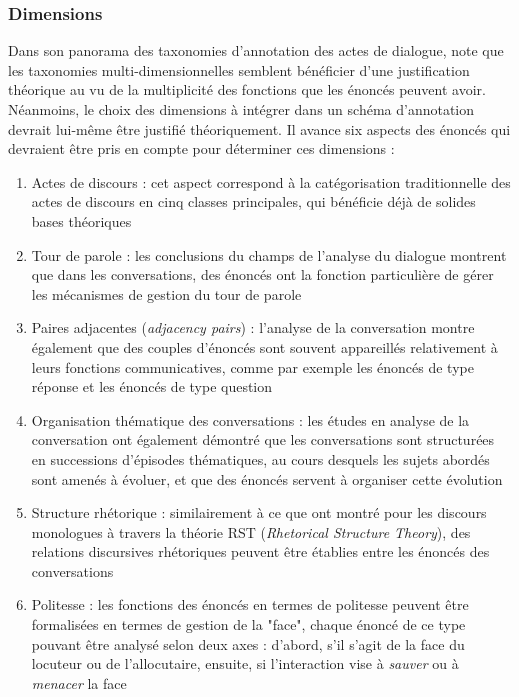 \documentclass[10pt,a4paper,twoside]{article}
\begin{document}
\subsubsection{Dimensions}
\label{subsubsec:dimensions}

Dans son panorama des taxonomies d'annotation des actes de dialogue, \citet{popescu2005dialogue} note que les taxonomies multi-dimensionnelles semblent bénéficier d'une justification théorique au vu de la multiplicité des fonctions que les énoncés peuvent avoir. Néanmoins, le choix des dimensions à intégrer dans un schéma d'annotation devrait lui-même être justifié théoriquement. Il avance six aspects des énoncés qui devraient être pris en compte pour déterminer ces dimensions :

\begin{enumerate}
	\item Actes de discours : cet aspect correspond à la catégorisation traditionnelle des actes de discours en cinq classes principales, qui bénéficie déjà de solides bases théoriques \cite{austin1975how}
	\item Tour de parole : les conclusions du champs de l'analyse du dialogue montrent que dans les conversations, des énoncés ont la fonction particulière de gérer les mécanismes de gestion du tour de parole \cite{shriberg2004icsi}
	\item Paires adjacentes (\textit{adjacency pairs}) : l'analyse de la conversation montre également que des couples d'énoncés sont souvent appareillés relativement à leurs fonctions communicatives, comme par exemple les énoncés de type \og réponse \fg et les énoncés de type \og question \fg{} \cite{levinson1983pragmatics,schegloff1973opening}
	\item Organisation thématique des conversations : les études en analyse de la conversation ont également démontré que les conversations sont structurées en successions d'épisodes thématiques, au cours desquels les sujets abordés sont amenés à évoluer, et que des énoncés servent à organiser cette évolution \cite{schegloff1973opening}
	\item Structure rhétorique : similairement à ce que \citet{thompson1987rhetorical} ont montré pour les discours monologues à travers la théorie RST (\textit{Rhetorical Structure Theory}), des relations discursives rhétoriques peuvent être établies entre les énoncés des conversations \cite{asher2003logics}
	\item Politesse : les fonctions des énoncés en termes de politesse peuvent être formalisées en termes de gestion de la "face", chaque énoncé de ce type pouvant être analysé selon deux axes : d'abord, s'il s'agit de la face du locuteur ou de l'allocutaire, ensuite, si l'interaction vise à \textit{sauver} ou à \textit{menacer} la face \cite{brown1987politeness}
\end{enumerate}
\end{document}
